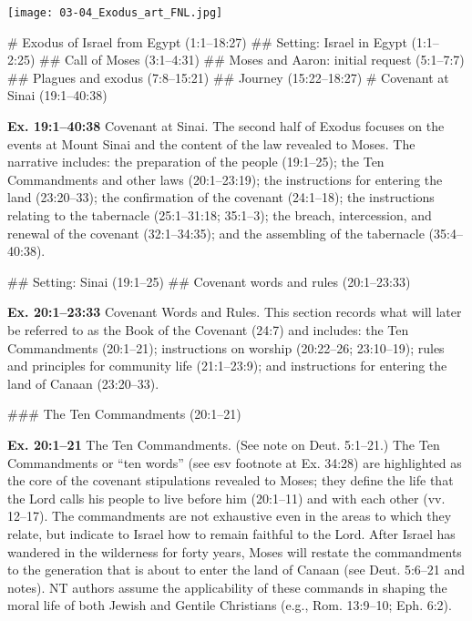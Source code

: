 \documentclass{bible-study-handout}
\begin{document}
\begin{figure*}[t]
  \centerline{\texttt{[image: 03-04\_Exodus\_art\_FNL.jpg]}}
\end{figure*}

\begin{bookoutline}
# Exodus of Israel from Egypt (1:1–18:27)
## Setting: Israel in Egypt (1:1–2:25)
## Call of Moses (3:1–4:31)
## Moses and Aaron: initial request (5:1–7:7)
## Plagues and exodus (7:8–15:21)
## Journey (15:22–18:27)
# Covenant at Sinai (19:1–40:38)
\end{bookoutline}

\begin{studyblock*}\textbf{Ex. 19:1–40:38} Covenant at Sinai. The second half of Exodus focuses on the events at Mount Sinai and the content of the law revealed to Moses. The narrative includes: the preparation of the people (19:1–25); the Ten Commandments and other laws (20:1–23:19); the instructions for entering the land (23:20–33); the confirmation of the covenant (24:1–18); the instructions relating to the tabernacle (25:1–31:18; 35:1–3); the breach, intercession, and renewal of the covenant (32:1–34:35); and the assembling of the tabernacle (35:4–40:38).\end{studyblock*}

\begin{bookoutline}
## Setting: Sinai (19:1–25)
## Covenant words and rules (20:1–23:33)
\end{bookoutline}

\begin{studyblock*}\textbf{Ex. 20:1–23:33} Covenant Words and Rules. This section records what will later be referred to as the Book of the Covenant (24:7) and includes: the Ten Commandments (20:1–21); instructions on worship (20:22–26; 23:10–19); rules and principles for community life (21:1–23:9); and instructions for entering the land of Canaan (23:20–33).\end{studyblock*}

\begin{bookoutline}
### The Ten Commandments (20:1–21)
\end{bookoutline}

\begin{studyblock*}\textbf{Ex. 20:1–21} The Ten Commandments. (See note on Deut. 5:1–21.) The Ten Commandments or “ten words” (see esv footnote at Ex. 34:28) are highlighted as the core of the covenant stipulations revealed to Moses; they define the life that the Lord calls his people to live before him (20:1–11) and with each other (vv. 12–17). The commandments are not exhaustive even in the areas to which they relate, but indicate to Israel how to remain faithful to the Lord. After Israel has wandered in the wilderness for forty years, Moses will restate the commandments to the generation that is about to enter the land of Canaan (see Deut. 5:6–21 and notes). NT authors assume the applicability of these commands in shaping the moral life of both Jewish and Gentile Christians (e.g., Rom. 13:9–10; Eph. 6:2).\end{studyblock*}
\end{document}
